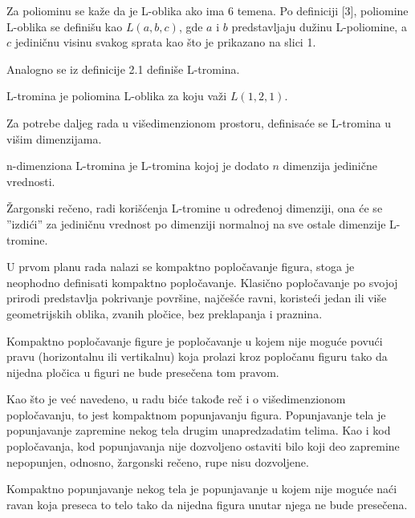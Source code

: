 \begin{Definition}
       Za poliominu se kaže da je L-oblika ako ima 6 temena. Po definiciji [3], poliomine L-oblika se definišu kao $L(a, b, c)$, gde $a$ i $b$ predstavljaju dužinu L-poliomine, a $c$ jediničnu visinu svakog sprata kao što je prikazano na slici 1.
\end{Definition}

Analogno se iz definicije 2.1 definiše L-tromina.

\begin{Definition}
    L-tromina je poliomina L-oblika za koju važi $L(1, 2, 1)$.  
\end{Definition}

Za potrebe daljeg rada u višedimenzionom prostoru, definisaće se L-tromina u višim dimenzijama.

\begin{Definition}
      n-dimenziona L-tromina je L-tromina kojoj je dodato $n$ dimenzija jedinične vrednosti.
\end{Definition}

Žargonski rečeno, radi korišćenja L-tromine u određenoj dimenziji, ona će se ”izdići” za jediničnu vrednost po dimenziji normalnoj na sve ostale dimenzije L-tromine.

U prvom planu rada nalazi se kompaktno popločavanje figura, stoga je neophodno definisati kompaktno popločavanje. Klasično popločavanje po svojoj prirodi predstavlja pokrivanje površine, najčešće ravni, koristeći jedan ili više geometrijskih oblika, zvanih pločice, bez preklapanja i praznina.

\begin{Definition}
    Kompaktno popločavanje figure je popločavanje u kojem nije moguće povući pravu (horizontalnu ili vertikalnu) koja prolazi kroz popločanu figuru tako da nijedna pločica u figuri ne bude presečena tom pravom.
\end{Definition}

Kao što je već navedeno, u radu biće takođe reč i o višedimenzionom popločavanju, to jest kompaktnom popunjavanju figura. Popunjavanje tela je popunjavanje zapremine nekog tela drugim unapredzadatim telima. Kao i kod popločavanja, kod popunjavanja nije dozvoljeno ostaviti bilo koji deo zapremine nepopunjen, odnosno, žargonski rečeno, rupe nisu dozvoljene.

\begin{Definition}
    Kompaktno popunjavanje nekog tela je popunjavanje u kojem nije moguće naći ravan koja preseca to telo tako da nijedna figura unutar njega ne bude presečena.
\end{Definition}

